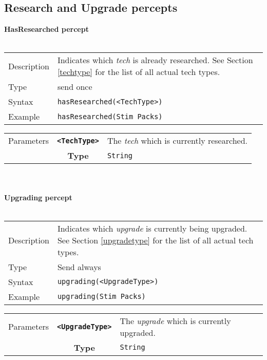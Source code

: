 \subsection{Research and Upgrade percepts}
\textbf{HasResearched percept}\\
\\
\begin{tabularx}{\textwidth}{lX}
 Description & Indicates which \textit{tech} is already researched. See Section \ref{techtype} for the list of all actual tech types. \\
 Type & send once \\
 Syntax & \verb|hasResearched(<TechType>)| \\
 Example & \verb|hasResearched(Stim Packs)| \\ 
 \end{tabularx}
 \begin{tabularx}{\textwidth}{l | c | p{8cm}|}
 \cline{2-3} 
 Parameters & \textbf{\verb|<TechType>|} & The \textit{tech} which is currently researched. \\
            & \textbf{Type} & \verb|String| \\
            \cline{2-3} 
\end{tabularx}\\
\\
\textbf{Upgrading percept}\\
\\
\begin{tabularx}{\textwidth}{lX}
 Description & Indicates which \textit{upgrade} is currently being upgraded. See Section \ref{upgradetype} for the list of all actual tech types. \\
 Type & Send always \\
 Syntax & \verb|upgrading(<UpgradeType>)| \\
 Example & \verb|upgrading(Stim Packs)| \\ 
 \end{tabularx}
 \begin{tabularx}{\textwidth}{l | c | p{8cm}|}
 \cline{2-3} 
 Parameters & \textbf{\verb|<UpgradeType>|} & The \textit{upgrade} which is currently upgraded. \\
            & \textbf{Type} & \verb|String| \\
            \cline{2-3} 
\end{tabularx}\\
\\

